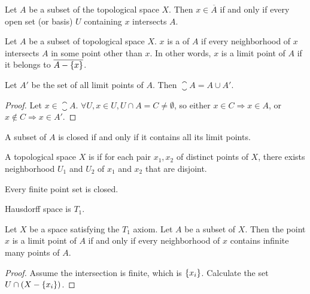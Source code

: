 \begin{theorem}
Let $A$ be a subset of the topological space $X$. Then $x \in \overline{A}$ if and only if every open set (or basis) $U$ containing $x$ intersects $A$.
\end{theorem}

\begin{definition}
    Let $A$ be a subset of topological space $X$. $x$ is a  of $A$ if every neighborhood of $x$ intersects $A$ in some point other than $x$. In other words,  $x$ is a limit point of $A$ if it belongs to $\overline{A - \set{x}}$.
\end{definition}

\begin{theorem}
    Let $A'$ be the set of all limit points of $A$. Then $\closure{A} = A \cup A'$.
\end{theorem}
\begin{proof}
    Let $x \in \closure{A}$. $\forall U, x \in U, U \cap A = C \neq \emptyset$, so either $x \in C \Rightarrow x \in A$, or $x \notin C \Rightarrow x \in A'$.
\end{proof}

\begin{theorem}
A subset of $A$ is closed if and only if it contains all its limit points.    
\end{theorem}
\begin{definition}
    A topological space $X$ is  if for each pair $x_1, x_2$ of distinct points of $X$, there exists neighborhood $U_1$ and $U_2$ of $x_1$ and $x_2$ that are disjoint.
\end{definition}

\begin{definition}
Every finite point set is closed.    
\end{definition}

\begin{theorem}
Hausdorff space is $T_1$.
\end{theorem}


\begin{theorem}
Let $X$ be a space satisfying the $T_1$ axiom. Let $A$ be a subset of $X$. Then the point $x$ is a limit point of $A$ if and only if every neighborhood of $x$ contains infinite many points of $A$.    
\end{theorem}
\begin{proof}
    Assume the intersection is finite, which is $\set{x_i}$. Calculate the set $U \cap (X - \set{x_i})$.
\end{proof}


